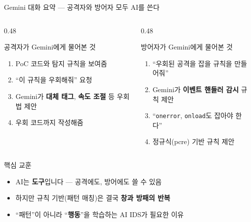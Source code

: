 \documentclass[aspectratio=169,10pt]{beamer}
\newcommand{\hlt}[1]{\textcolor{accent}{\textbf{#1}}}
\begin{document}
\begin{frame}{Gemini 대화 요약 — 공격자와 방어자 모두 AI를 쓴다}

\begin{columns}[T]
\begin{column}{0.48\textwidth}
\begin{block}{공격자가 Gemini에게 물어본 것}
\begin{enumerate}
    \item PoC 코드와 탐지 규칙을 보여줌
    \item ``이 규칙을 우회해줘'' 요청
    \item Gemini가 \hlt{대체 태그}, \hlt{속도 조절} 등 우회법 제안
    \item 우회 코드까지 작성해줌
\end{enumerate}
\end{block}
\end{column}
\begin{column}{0.48\textwidth}
\begin{block}{방어자가 Gemini에게 물어본 것}
\begin{enumerate}
    \item ``우회된 공격을 잡을 규칙을 만들어줘''
    \item Gemini가 \hlt{이벤트 핸들러 감시} 규칙 제안
    \item ``\texttt{onerror}, \texttt{onload}도 잡아야 한다''
    \item 정규식(pcre) 기반 규칙 제안
\end{enumerate}
\end{block}
\end{column}
\end{columns}

\vspace{0.5em}
\begin{alertblock}{핵심 교훈}
\begin{itemize}
    \item AI는 \hlt{도구}입니다 — 공격에도, 방어에도 쓸 수 있음
    \item 하지만 규칙 기반(패턴 매칭)은 결국 \hlt{창과 방패의 반복}
    \item ``패턴''이 아니라 ``\hlt{행동}''을 학습하는 AI IDS가 필요한 이유
\end{itemize}
\end{alertblock}
\end{frame}
\end{document}
